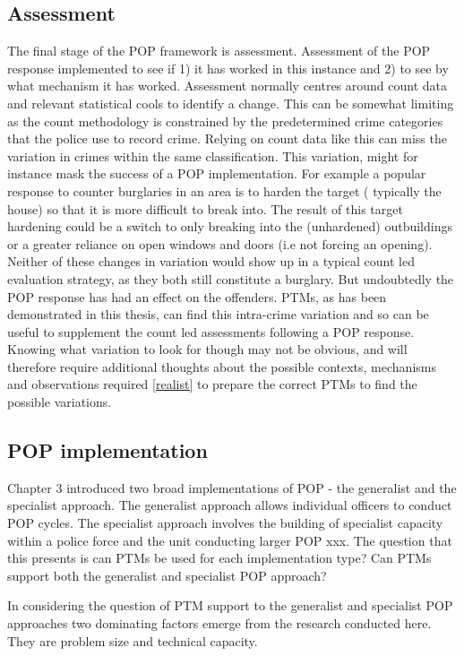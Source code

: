 \subsection{Assessment} The final stage of the POP framework is assessment. Assessment of the POP response implemented to see if 1) it has worked in this instance and 2) to see by what mechanism it has worked. Assessment normally centres around count data and relevant statistical cools to identify a change. This can be somewhat limiting as the count methodology is constrained by the predetermined crime categories that the police use to record crime. Relying on count data like this can miss the variation in crimes within the same classification. This variation, might for instance mask the success of a POP implementation. For example a popular response to counter burglaries in an area is to harden the target ( typically the house) so that it is more difficult to break into. The result of this target hardening could be a switch to only breaking into the (unhardened) outbuildings or a greater reliance on open windows and doors (i.e not forcing an opening). Neither of these changes in variation would show up in a typical count led evaluation strategy, as they both still constitute a burglary. But undoubtedly the POP response has had an effect on the offenders. PTMs, as has been demonstrated in this thesis, can find this intra-crime variation and so can be useful to supplement the count led assessments following a POP response. Knowing what variation to look for though may not be obvious, and will therefore require additional thoughts about the possible contexts, mechanisms and observations required \ref{realist} to prepare the correct PTMs to find the possible variations.

\subsection{POP implementation} Chapter 3 introduced two broad implementations of POP - the generalist and the specialist approach. The generalist approach allows individual officers to conduct POP cycles. The specialist approach involves the building of specialist capacity within a police force and the unit conducting larger POP xxx. The question that this presents is can PTMs be used for each implementation type? Can PTMs support both the generalist and specialist POP approach? 

In considering the question of PTM support to the generalist and specialist POP approaches two dominating factors emerge from the research conducted here. They are problem size and technical capacity. 

